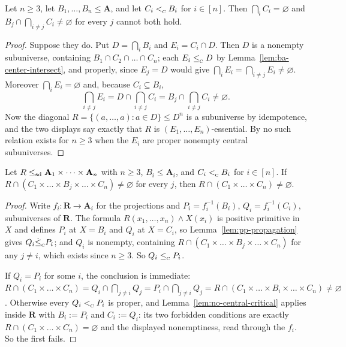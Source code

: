 \begin{lemma}\label{lem:no-central-critical}
Let $n\ge3$, let $B_{1},\dots,B_{n}\le\mathbf A$, and let
$C_{i}<_{\textup{\textsc{c}}}^{}B_{i}$ for $i\in[n]$. Then
$\bigcap_{i}C_{i}=\varnothing$ and $B_{j}\cap\bigcap_{i\neq j}C_{i}\neq
\varnothing$ for every $j$ cannot both hold.
\end{lemma}

\begin{proof}
Suppose they do. Put $D=\bigcap_{i}B_{i}$ and $E_{i}=C_{i}\cap D$. Then $D$ is
a nonempty subuniverse, containing $B_{1}\cap C_{2}\cap\dots\cap C_{n}$; each
$E_{i}\le_{\textup{\textsc{c}}}^{}D$ by Lemma~\ref{lem:ba-center-intersect}, and properly, since
$E_{j}=D$ would give $\bigcap_{i}E_{i}=\bigcap_{i\neq j}E_{i}\neq\varnothing$.
Moreover $\bigcap_{i}E_{i}=\varnothing$ and, because $C_{i}\subseteq B_{i}$,
\[
  \textstyle\bigcap_{i\neq j}E_{i}=D\cap\bigcap_{i\neq j}C_{i}
  =B_{j}\cap\bigcap_{i\neq j}C_{i}\neq\varnothing .
\]
Now the diagonal $R=\{(a,\dots,a):a\in D\}\le D^{n}$ is a subuniverse by
idempotence, and the two displays say exactly that $R$ is
$(E_{1},\dots,E_{n})$-essential. By \cite[Lem.~6.11]{ZhukStrong} no such
relation exists for $n\ge3$ when the $E_{i}$ are proper nonempty central
subuniverses.
\end{proof}

\begin{corollary}\label{cor:no-central-critical}
Let $R\le_{\mathrm{sd}}\mathbf A_{1}\times\dots\times\mathbf A_{n}$ with $n\ge3$,
$B_{i}\le\mathbf A_{i}$, and $C_{i}<_{\textup{\textsc{c}}}^{}B_{i}$ for $i\in[n]$. If
$R\cap(C_{1}\times\dots\times B_{j}\times\dots\times C_{n})\neq\varnothing$
for every $j$, then $R\cap(C_{1}\times\dots\times C_{n})\neq\varnothing$.
\end{corollary}

\begin{proof}
Write $f_{i}\colon\mathbf R\to\mathbf A_{i}$ for the projections and
$P_{i}=f_{i}^{-1}(B_{i})$, $Q_{i}=f_{i}^{-1}(C_{i})$, subuniverses of
$\mathbf R$. The formula $R(x_{1},\dots,x_{n})\wedge X(x_{i})$ is positive
primitive in $X$ and defines $P_{i}$ at $X=B_{i}$ and $Q_{i}$ at $X=C_{i}$, so
Lemma~\ref{lem:pp-propagation} gives $Q_{i}\dot\le_{\textup{\textsc{c}}}^{}P_{i}$; and $Q_{i}$ is
nonempty, containing $R\cap(C_{1}\times\dots\times B_{j}\times\dots\times
C_{n})$ for any $j\neq i$, which exists since $n\ge3$. So
$Q_{i}\le_{\textup{\textsc{c}}}^{}P_{i}$.

If $Q_{i}=P_{i}$ for some $i$, the conclusion is immediate:
$R\cap(C_{1}\times\dots\times C_{n})
=Q_{i}\cap\bigcap_{j\neq i}Q_{j}
=P_{i}\cap\bigcap_{j\neq i}Q_{j}
=R\cap(C_{1}\times\dots\times B_{i}\times\dots\times C_{n})\neq\varnothing$.
Otherwise every $Q_{i}<_{\textup{\textsc{c}}}^{}P_{i}$ is proper, and
Lemma~\ref{lem:no-central-critical} applies inside $\mathbf R$ with
$B_{i}:=P_{i}$ and $C_{i}:=Q_{i}$: its two forbidden conditions are exactly
$R\cap(C_{1}\times\dots\times C_{n})=\varnothing$ and the displayed
nonemptiness, read through the $f_{i}$. So the first fails.
\end{proof}

